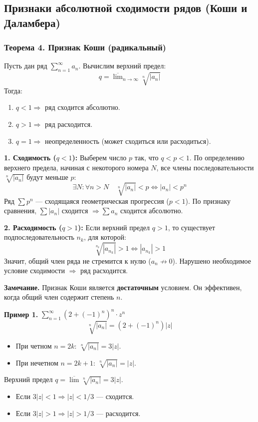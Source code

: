 \subsection{Признаки абсолютной сходимости рядов (Коши и Даламбера)}

\subsubsection{Теорема 4. Признак Коши (радикальный)}
Пусть дан ряд $\sum_{n=1}^\infty a_n$. Вычислим верхний предел:
\[ q = \overline{\lim}_{n\to\infty} \sqrt[n]{|a_n|} \]
Тогда:
\begin{enumerate}
    \item $q < 1 \Rightarrow$ ряд сходится абсолютно.
    \item $q > 1 \Rightarrow$ ряд расходится.
    \item $q = 1 \Rightarrow$ неопределенность (может сходиться или расходиться).
\end{enumerate}

\begin{tcolorbox}[title=Доказательство]
    \textbf{1. Сходимость ($q < 1$):}
    Выберем число $p$ так, что $q < p < 1$.
    По определению верхнего предела, начиная с некоторого номера $N$, все члены последовательности $\sqrt[n]{|a_n|}$ будут меньше $p$:
    \[ \exists N: \forall n > N \quad \sqrt[n]{|a_n|} < p \iff |a_n| < p^n \]
    Ряд $\sum p^n$ — сходящаяся геометрическая прогрессия ($p < 1$).
    По признаку сравнения, $\sum |a_n|$ сходится $\Rightarrow \sum a_n$ сходится абсолютно.

    \textbf{2. Расходимость ($q > 1$):}
    Если верхний предел $q > 1$, то существует подпоследовательность $n_k$, для которой:
    \[ \sqrt[n_k]{|a_{n_k}|} > 1 \iff |a_{n_k}| > 1 \]
    Значит, общий член ряда не стремится к нулю ($a_n \not\to 0$).
    Нарушено необходимое условие сходимости $\Rightarrow$ ряд расходится.
\end{tcolorbox}

\textbf{Замечание.} Признак Коши является \textbf{достаточным} условием. Он эффективен, когда общий член содержит степень $n$.

\textbf{Пример 1.} $\sum_{n=1}^\infty (2+(-1)^n)^n \cdot z^n$
\[ \sqrt[n]{|a_n|} = (2+(-1)^n)|z| \]
\begin{itemize}
    \item При четном $n=2k$: $\sqrt[n]{|a_n|} = 3|z|$.
    \item При нечетном $n=2k+1$: $\sqrt[n]{|a_n|} = |z|$.
\end{itemize}
Верхний предел $q = \overline{\lim} \sqrt[n]{|a_n|} = 3|z|$.
\begin{itemize}
    \item Если $3|z| < 1 \Rightarrow |z| < 1/3$ — сходится.
    \item Если $3|z| > 1 \Rightarrow |z| > 1/3$ — расходится.
\end{itemize}

